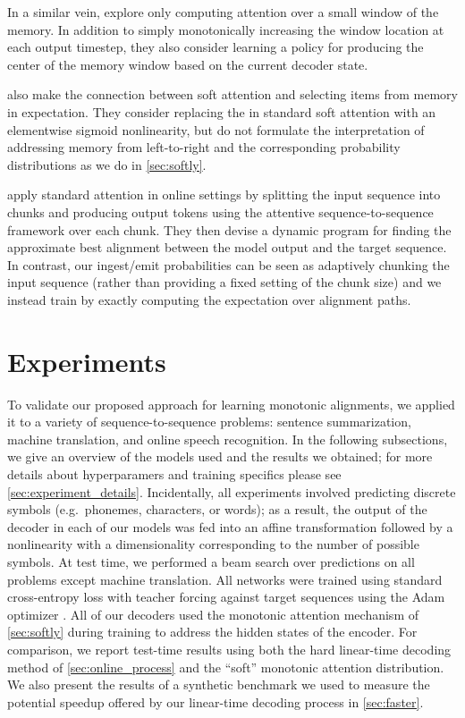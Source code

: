 \documentclass{article}
\begin{document}
In a similar vein,  explore only computing attention over a small window of the memory.
In addition to simply monotonically increasing the window location at each output timestep, they also consider learning a policy for producing the center of the memory window based on the current decoder state.

 also make the connection between soft attention and selecting items from memory in expectation.
They consider replacing the  in standard soft attention with an elementwise sigmoid nonlinearity, but do not formulate the interpretation of addressing memory from left-to-right and the corresponding probability distributions as we do in \cref{sec:softly}.

 apply standard  attention in online settings by splitting the input sequence into chunks and producing output tokens using the attentive sequence-to-sequence framework over each chunk.
They then devise a dynamic program for finding the approximate best alignment between the model output and the target sequence.
In contrast, our ingest/emit probabilities  can be seen as adaptively chunking the input sequence (rather than providing a fixed setting of the chunk size) and we instead train by exactly computing the expectation over alignment paths.

\section{Experiments}
\label{sec:experiments}

To validate our proposed approach for learning monotonic alignments, we applied it to a variety of sequence-to-sequence problems: sentence summarization, machine translation, and online speech recognition.
In the following subsections, we give an overview of the models used and the results we obtained; for more details about hyperparamers and training specifics please see \cref{sec:experiment_details}.
Incidentally, all experiments involved predicting discrete symbols (e.g.\ phonemes, characters, or words); as a result, the output of the decoder in each of our models was fed into an affine transformation followed by a  nonlinearity with a dimensionality corresponding to the number of possible symbols.
At test time, we performed a beam search over  predictions on all problems except machine translation.
All networks were trained using standard cross-entropy loss with teacher forcing against target sequences using the Adam optimizer .
All of our decoders used the monotonic attention mechanism of \cref{sec:softly} during training to address the hidden states of the encoder.
For comparison, we report test-time results using both the hard linear-time decoding method of \cref{sec:online_process} and the ``soft'' monotonic attention distribution.
We also present the results of a synthetic benchmark we used to measure the potential speedup offered by our linear-time decoding process in \cref{sec:faster}.
\end{document}
